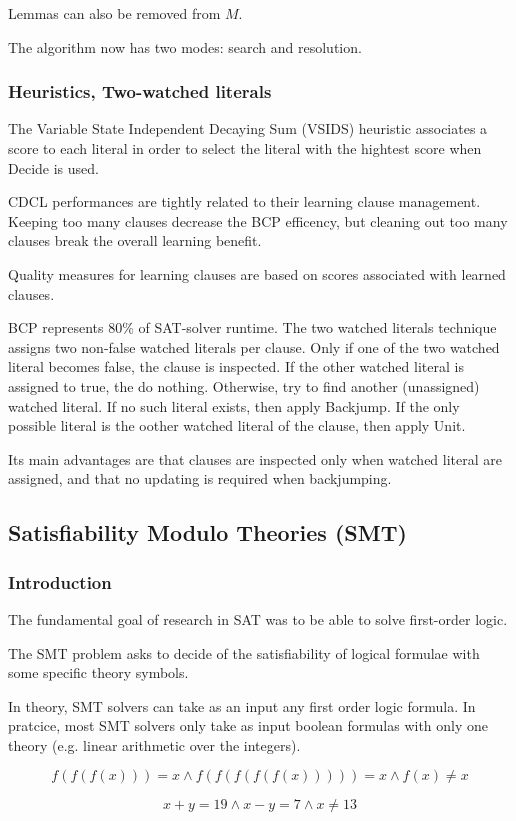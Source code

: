 \documentclass[toc]{../cs-classes/cs-classes}
\begin{document}
Lemmas can also be removed from $M$.

The algorithm now has two modes: search and resolution. 

\subsubsection{Heuristics, Two-watched literals}
The Variable State Independent Decaying Sum (VSIDS) heuristic associates a score to each literal in order to select the literal with the hightest score when Decide is used.

CDCL performances are tightly related to their learning clause management. Keeping too many clauses decrease the BCP efficency, but cleaning out too many clauses break the overall learning benefit.

Quality measures for learning clauses are based on scores associated with learned clauses. 

BCP represents 80\% of SAT-solver runtime. The two watched literals technique assigns two non-false watched literals per clause. Only if one of the two watched literal becomes false, the clause is inspected. If the other watched literal is assigned to true, the do nothing. Otherwise, try to find another (unassigned) watched literal. If no such literal exists, then apply Backjump. If the only possible literal is the oother watched literal of the clause, then apply Unit.

Its main advantages are that clauses are inspected only when watched literal are assigned, and that no updating is required when backjumping.

\subsection{Satisfiability Modulo Theories (SMT)}
\subsubsection{Introduction}
The fundamental goal of research in SAT was to be able to solve first-order logic.

The SMT problem asks to decide of the satisfiability of logical formulae with some specific theory symbols. 

In theory, SMT solvers can take as an input any first order logic formula. In pratcice, most SMT solvers only take as input boolean formulas with only one theory (e.g. linear arithmetic over the integers).

\begin{example}
    \begin{equation*}
        f(f(f(x))) = x \land f(f(f(f(f(x))))) = x \land f(x) \neq x
    \end{equation*}

    \begin{equation*}
        x+y = 19 \land x-y=7 \land x\neq 13
    \end{equation*}
\end{example}
\end{document}
